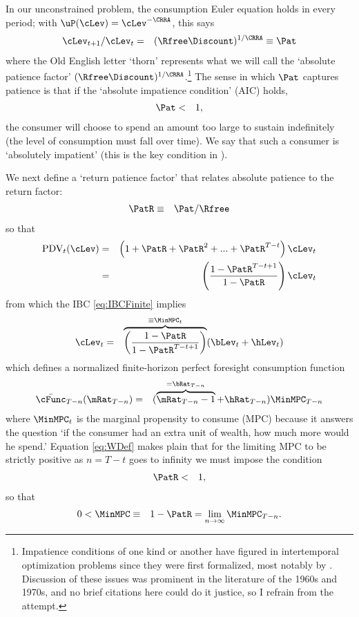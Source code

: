 \documentclass[titlepage]{\econtex}\providecommand{\texname}{BufferStockTheory}%
\begin{document}
In our unconstrained problem, the consumption Euler equation holds in every period; with $\uP(\cLev)=\cLev^{-\CRRA}$, this says
\begin{eqnarray}
 \cLev_{t+1}/\cLev_{t} & = & (\Rfree\Discount)^{1/\CRRA} \equiv \Pat \label{eq:cGrowPF} \label{eq:Pat}
\end{eqnarray}
where the Old English letter `thorn' represents what we will call the
`absolute patience factor' $(\Rfree
\Discount)^{1/\CRRA}$.\footnote{Impatience conditions of one kind or
  another have figured in intertemporal optimization problems since
  they were first formalized, most notably by \cite{ramsey:save}.
  Discussion of these issues was prominent in the literature of the
  1960s and 1970s, and no brief citations here could do it justice, so
  I refrain from the attempt.}  The sense in which $\Pat$ captures
patience is that if the `absolute impatience condition' (AIC) holds,
\begin{eqnarray}
  \label{eq:AIC}
  \Pat & < & 1,
\end{eqnarray}
the consumer will choose to spend an amount too large to sustain indefinitely (the
level of consumption must fall over time).  We say that such a consumer is
`absolutely impatient' (this is the key condition in \cite{bewleyPIH}).

We next define a `return patience factor' that relates absolute patience to the return factor:
\begin{eqnarray}
 \PatR & \equiv & {\Pat}/\Rfree \label{eq:PatR}
\end{eqnarray}
so that
\begin{eqnarray*}
  \text{PDV}_{t}(\cLev) & = & \left(1+\PatR+\PatR^{2}+...+ \PatR^{T-t}\right)\cLev_{t} \notag
\\ & = & \left(\frac{1-\PatR^{T-t+1}}{1-\PatR}\right)\cLev_{t}
\end{eqnarray*}
from which the IBC \eqref{eq:IBCFinite} implies
\begin{eqnarray}
  \cLev_{t} & = & \overbrace{\left(\frac{1-\PatR}{1-\PatR^{T-t+1}}\right)}^{\equiv \MinMPC_{t}}
(\bLev_{t}+\hLev_{t}) \label{eq:vecMuDef} \label{eq:WDef}
\end{eqnarray}
which defines a normalized finite-horizon perfect foresight consumption function
\begin{eqnarray}
  \bar{\cFunc}_{T-n}(\mRat_{T-n}) & = & (\overbrace{\mRat_{T-n}-1}^{=\bRat_{T-n}}+\hRat_{T-n})\MinMPC_{T-n}
\end{eqnarray}
where $\MinMPC_{t}$ is the marginal propensity to consume (MPC) because it answers the
question `if the consumer had an extra unit of wealth, how much more would he spend.'
Equation \eqref{eq:WDef} makes plain that for the limiting
MPC to be strictly positive as $n=T-t$ goes to infinity we must impose the
condition
\begin{eqnarray}
\PatR & < & 1 \label{eq:PDVCFinite} \label{eq:RIC},
\end{eqnarray}
so that
\begin{eqnarray}
   0 <  \MinMPC & \equiv &  1-\PatR = \lim_{n \rightarrow \infty} \MinMPC_{T-n} \label{eq:MinMPCDef}
.
\end{eqnarray}
\end{document}
